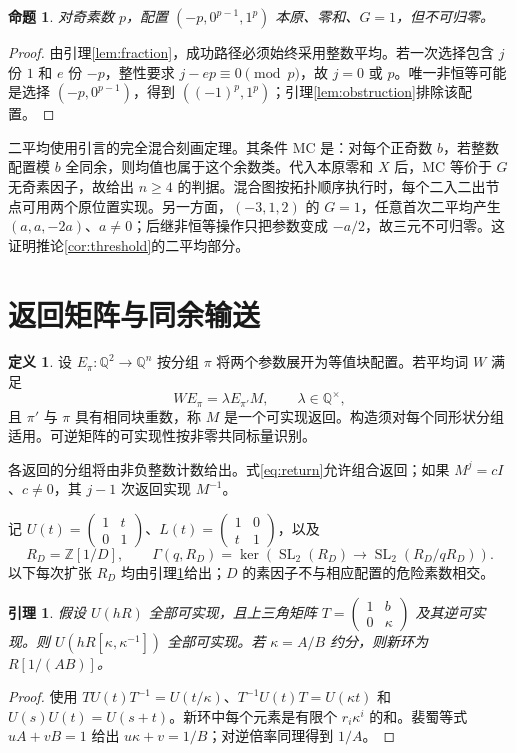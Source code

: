 \documentclass[11pt,a4paper]{article}
\newcommand{\Z}{\mathbb Z}
\newcommand{\Q}{\mathbb Q}
\newcommand{\SL}{\operatorname{SL}}
\newtheorem{lemma}[theorem]{引理}
\newtheorem{proposition}[theorem]{命题}
\theoremstyle{definition}
\newtheorem{definition}[theorem]{定义}
\numberwithin{equation}{section}
\begin{document}
\begin{proposition}\label{prop:lower}
对奇素数 $p$，配置 $(-p,0^{p-1},1^p)$ 本原、零和、$G=1$，但不可归零。
\end{proposition}
\begin{proof}
由引理\ref{lem:fraction}，成功路径必须始终采用整数平均。若一次选择包含 $j$ 份 $1$ 和 $e$ 份 $-p$，整性要求 $j-ep\equiv0\pmod p$，故 $j=0$ 或 $p$。唯一非恒等可能是选择 $(-p,0^{p-1})$，得到 $((-1)^p,1^p)$；引理\ref{lem:obstruction}排除该配置。
\end{proof}

二平均使用\cite{mixing}引言的完全混合刻画定理。其条件 MC 是：对每个正奇数 $b$，若整数配置模 $b$ 全同余，则均值也属于这个余数类。代入本原零和 $X$ 后，MC 等价于 $G$ 无奇素因子，故给出 $n\ge4$ 的判据。混合图按拓扑顺序执行时，每个二入二出节点可用两个原位置实现。另一方面，$(-3,1,2)$ 的 $G=1$，任意首次二平均产生 $(a,a,-2a)$、$a\ne0$；后继非恒等操作只把参数变成 $-a/2$，故三元不可归零。这证明推论\ref{cor:threshold}的二平均部分。


\section{返回矩阵与同余输送}
\begin{definition}
设 $E_\pi:\Q^2\to\Q^n$ 按分组 $\pi$ 将两个参数展开为等值块配置。若平均词 $W$ 满足
\begin{equation}\label{eq:return}
WE_\pi=\lambda E_{\pi'}M,\qquad \lambda\in\Q^\times,
\end{equation}
且 $\pi'$ 与 $\pi$ 具有相同块重数，称 $M$ 是一个可实现返回。构造须对每个同形状分组适用。可逆矩阵的可实现性按非零共同标量识别。
\end{definition}
各返回的分组将由非负整数计数给出。式\eqref{eq:return}允许组合返回；如果 $M^j=cI$、$c\ne0$，其 $j-1$ 次返回实现 $M^{-1}$。

记 $U(t)=\left(\begin{smallmatrix}1&t\\0&1\end{smallmatrix}\right)$、$L(t)=\left(\begin{smallmatrix}1&0\\t&1\end{smallmatrix}\right)$，以及
\[
R_D=\Z[1/D],\qquad
\Gamma(q,R_D)=\ker(\SL_2(R_D)\to\SL_2(R_D/qR_D)).
\]
以下每次扩张 $R_D$ 均由引理\ref{lem:localize}给出；$D$ 的素因子不与相应配置的危险素数相交。

\begin{lemma}\label{lem:localize}
假设 $U(hR)$ 全部可实现，且上三角矩阵 $T=\left(\begin{smallmatrix}1&b\\0&\kappa\end{smallmatrix}\right)$ 及其逆可实现。则 $U(hR[\kappa,\kappa^{-1}])$ 全部可实现。若 $\kappa=A/B$ 约分，则新环为 $R[1/(AB)]$。
\end{lemma}
\begin{proof}
使用 $TU(t)T^{-1}=U(t/\kappa)$、$T^{-1}U(t)T=U(\kappa t)$ 和 $U(s)U(t)=U(s+t)$。新环中每个元素是有限个 $r_i\kappa^i$ 的和。裴蜀等式 $uA+vB=1$ 给出 $u\kappa+v=1/B$；对逆倍率同理得到 $1/A$。
\end{proof}
\end{document}
